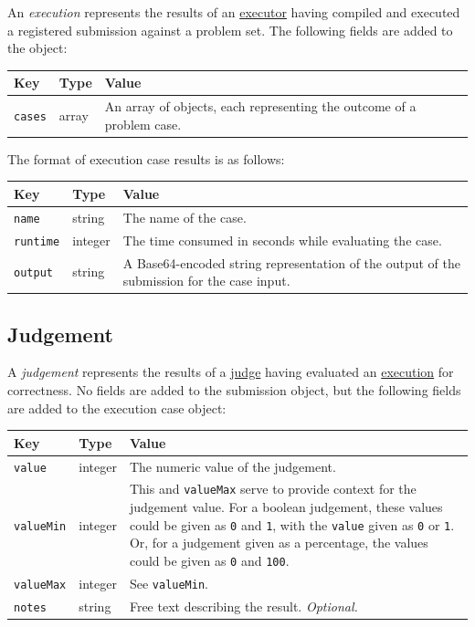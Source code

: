 \documentclass[11pt,letterpaper]{article}
\begin{document}
An \emph{execution} represents the results of an
\hyperref[design-exec-judge]{executor} having compiled and executed a
registered submission against a problem set. The following fields are added to
the object:

\nopagebreak
\begin{tabulary}{\textwidth}{ | l | l | L | }
    \hline
    \textbf{Key} & \textbf{Type} & \textbf{Value} \\
    \hline
    \texttt{cases} & array & An array of objects, each representing the outcome
        of a problem case. \\
    \hline
\end{tabulary}

The format of execution case results is as follows:

\nopagebreak
\begin{tabulary}{\textwidth}{ | l | l | L | }
    \hline
    \textbf{Key} & \textbf{Type} & \textbf{Value} \\
    \hline
    \texttt{name} & string & The name of the case. \\
    \hline
    \texttt{runtime} & integer & The time consumed in seconds while evaluating
        the case. \\
    \hline
    \texttt{output} & string & A Base64-encoded string representation of the
        output of the submission for the case input. \\
    \hline
\end{tabulary}

\subsection{Judgement}
\label{formats-judge}

A \emph{judgement} represents the results of a
\hyperref[design-exec-judge]{judge} having evaluated an
\hyperref[formats-exec]{execution} for correctness. No fields are added to
the submission object, but the following fields are added to the execution case
object:

\nopagebreak
\begin{tabulary}{\textwidth}{ | l | l | L | }
    \hline
    \textbf{Key} & \textbf{Type} & \textbf{Value} \\
    \hline
    \texttt{value} & integer & The numeric value of the judgement. \\
    \hline
    \texttt{valueMin} & integer & This and \texttt{valueMax} serve to provide
        context for the judgement value. For a boolean judgement, these values
        could be given as \texttt{0} and \texttt{1}, with the \texttt{value}
        given as \texttt{0} or \texttt{1}. Or, for a judgement given as a
        percentage, the values could be given as \texttt{0} and \texttt{100}.
        \\
    \hline
    \texttt{valueMax} & integer & See \texttt{valueMin}. \\
    \hline
    \texttt{notes} & string & Free text describing the result.
        \emph{Optional.} \\
    \hline
\end{tabulary}
\end{document}
